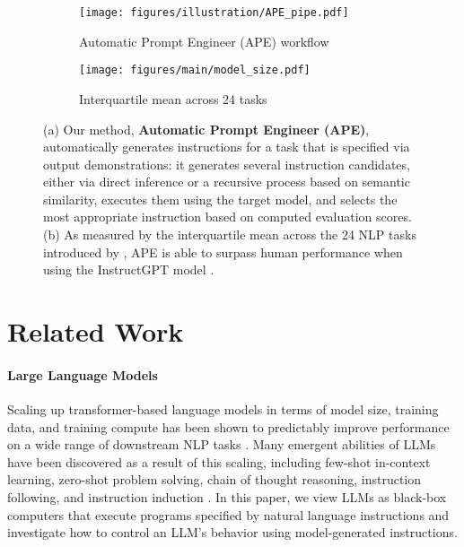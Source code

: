 \begin{figure}
  \centering
  \vspace{-0.05in}
\begin{subfigure}[b]{0.48\textwidth}
   \hfill\texttt{[image: figures/illustration/APE\_pipe.pdf]}\vspace{0.75em}
  \caption{Automatic Prompt Engineer (APE) workflow}
\end{subfigure}
 \begin{subfigure}[b]{0.49\textwidth}
  \texttt{[image: figures/main/model\_size.pdf]}
  \caption{Interquartile mean across 24 tasks}
  \end{subfigure}
  \caption{(a) Our method, \textbf{Automatic Prompt Engineer (APE)}, automatically generates instructions for a task that is specified via output demonstrations: it generates several instruction candidates, either via direct inference or a recursive process based on semantic similarity, executes them using the target model, and selects the most appropriate instruction based on computed evaluation scores. (b) As measured by the interquartile mean across the 24 NLP tasks introduced by \citet{honovich2022instruction}, APE is able to surpass human performance when using the InstructGPT model \citep{ouyang2022training}.}\label{fig:highlight}
\end{figure}\section{Related Work}

\paragraph{Large Language Models}
Scaling up transformer-based language models in terms of model size, training data, and training compute has been shown to predictably improve performance on a wide range of downstream NLP tasks \citep{vaswani2017attention, devlin2018bert, brown2020language}. Many emergent abilities \citep{wei2022emergent} of LLMs have been discovered as a result of this scaling, including few-shot in-context learning, zero-shot problem solving, chain of thought reasoning, instruction following, and instruction induction \citep{cobbe2021training, wei2022chain, kojima2022large, sanh2022multitask, wei2021finetuned, ouyang2022training, honovich2022instruction}. In this paper, we view LLMs as black-box computers that execute programs specified by natural language instructions and investigate how to control an LLM's behavior using model-generated instructions. 

